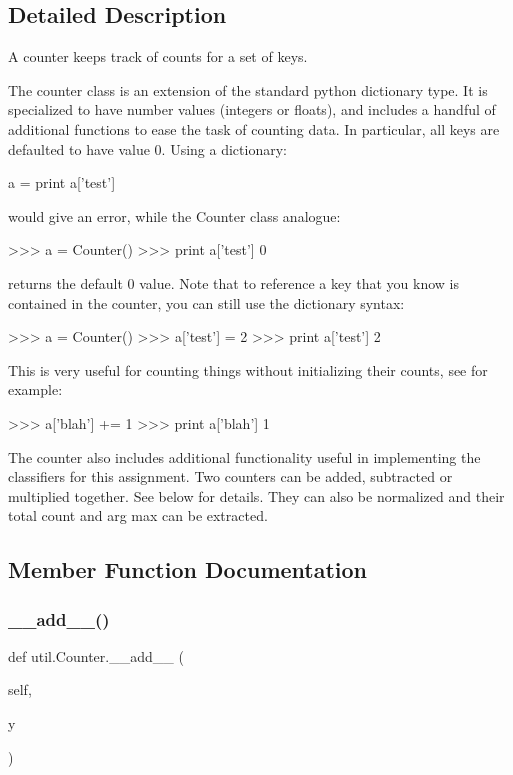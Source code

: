 \subsection{Detailed Description}
\begin{DoxyVerb}A counter keeps track of counts for a set of keys.

The counter class is an extension of the standard python
dictionary type.  It is specialized to have number values  
(integers or floats), and includes a handful of additional
functions to ease the task of counting data.  In particular, 
all keys are defaulted to have value 0.  Using a dictionary:

a = {}
print a['test']

would give an error, while the Counter class analogue:
  
>>> a = Counter()
>>> print a['test']
0

returns the default 0 value. Note that to reference a key 
that you know is contained in the counter, 
you can still use the dictionary syntax:
  
>>> a = Counter()
>>> a['test'] = 2
>>> print a['test']
2

This is very useful for counting things without initializing their counts,
see for example:

>>> a['blah'] += 1
>>> print a['blah']
1

The counter also includes additional functionality useful in implementing
the classifiers for this assignment.  Two counters can be added,
subtracted or multiplied together.  See below for details.  They can
also be normalized and their total count and arg max can be extracted.
\end{DoxyVerb}
 

\subsection{Member Function Documentation}
\mbox{\label{classutil_1_1_counter_ac9dfb7fe386dc63f8d27a66984d5bc75}} 
\subsubsection{\texorpdfstring{\+\_\+\+\_\+add\+\_\+\+\_\+()}{\_\_add\_\_()}}
{\footnotesize\ttfamily def util.\+Counter.\+\_\+\+\_\+add\+\_\+\+\_\+ (\begin{DoxyParamCaption}\item[{}]{self,  }\item[{}]{y }\end{DoxyParamCaption})}

